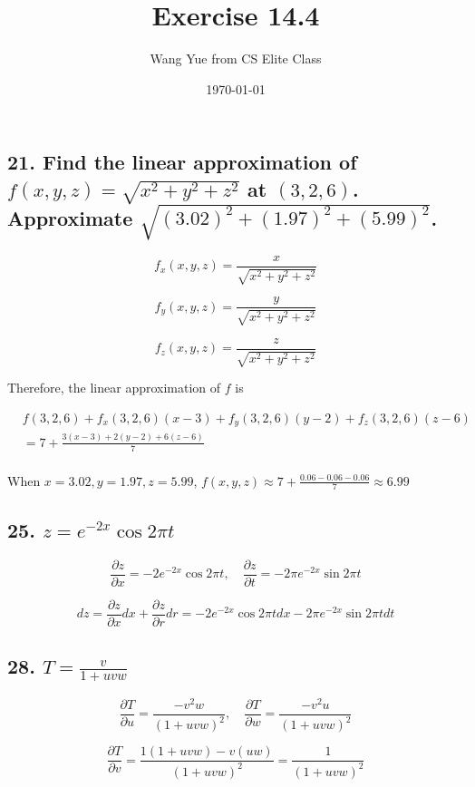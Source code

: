 \documentclass{article}
\begin{document}
    \title{Exercise 14.4}
    \author{Wang Yue from CS Elite Class}
    \date{\today}
    \maketitle

    \subsection*{21. Find the linear approximation of $f(x, y, z) = \sqrt{x^2+y^2+z^2}$ at $(3, 2, 6)$. Approximate $\sqrt{(3.02)^2+(1.97)^2+(5.99)^2}$.}

    $$f_x(x, y, z) = \frac{x}{\sqrt{x^2+y^2+z^2}}$$

    $$f_y(x, y, z) = \frac{y}{\sqrt{x^2+y^2+z^2}}$$

    $$f_z(x, y, z) = \frac{z}{\sqrt{x^2+y^2+z^2}}$$

    Therefore, the linear approximation of $f$ is

    $$\begin{aligned}
        &f(3, 2, 6) + f_x(3, 2, 6)(x-3) + f_y(3, 2, 6)(y - 2) + f_z(3, 2, 6)(z-6) \\ 
        &= 7 + \frac{3(x-3) + 2(y-2) + 6(z-6)}{7} \\
    \end{aligned}$$

    When $x = 3.02, y=1.97, z=5.99$, $f(x, y, z) \approx 7 + \frac{0.06 - 0.06 - 0.06}{7} \approx 6.99$

    \subsection*{25. $z = e^{-2x} \cos 2\pi t$}

    $$\frac{\partial z}{\partial x} = -2 e^{-2x}\cos 2\pi t, \quad \frac{\partial z}{\partial t} = -2\pi e^{-2x}\sin 2\pi t$$

    $$dz = \frac{\partial z}{\partial x}dx + \frac{\partial z}{\partial r}dr = -2e^{-2x}\cos 2\pi t dx - 2\pi e^{-2x} \sin 2\pi t dt$$

    \subsection*{28. $T = \frac{v}{1+uvw}$}

    $$\frac{\partial T}{\partial u} = \frac{-v^2w}{(1+uvw)^2}, \quad \frac{\partial T}{\partial w} = \frac{-v^2u}{(1+uvw)^2}$$

    $$\frac{\partial T}{\partial v} = \frac{1(1+uvw) - v(uw)}{(1+uvw)^2} = \frac{1}{(1+uvw)^2}$$
\end{document}
